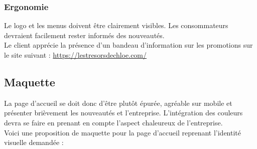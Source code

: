 \documentclass[a4paper, 12pt]{article}
\begin{document}
\subsubsection{Ergonomie}
Le logo et les menus doivent être clairement visibles. Les consommateurs devraient facilement rester informés des nouveautés.\\
Le client apprécie la présence d'un bandeau d'information sur les promotions sur le site suivant : \url{https://lestresorsdechloe.com/}
\subsection{Maquette}
La page d'accueil se doit donc d'être plutôt épurée, agréable sur mobile et présenter brièvement les nouveautés et l'entreprise. L'intégration des couleurs devra se faire en prenant en compte l'aspect chaleureux de l'entreprise.\\
Voici une proposition de maquette pour la page d'accueil reprenant l'identité visuelle demandée :
\end{document}
